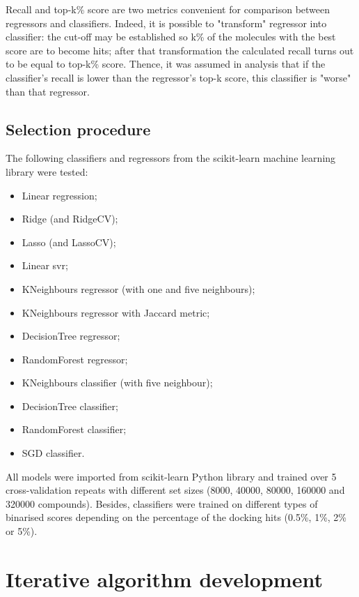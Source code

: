 Recall and top-k\% score are two metrics convenient for comparison between regressors and classifiers.
Indeed, it is possible to "transform" regressor into classifier: the cut-off may be established so k\% of the molecules with the best score are to become hits; after that transformation the calculated recall turns out to be equal to top-k\% score.
Thence, it was assumed in analysis that if the classifier's recall is lower than the regressor's top-k score, this classifier is "worse" than that regressor.\\

\subsection{Selection procedure}

The following classifiers and regressors from the scikit-learn machine learning library were tested:
\begin{itemize}
    \item Linear regression;
    \item Ridge (and RidgeCV);
    \item Lasso (and LassoCV);
    \item Linear \acrshort{svr};
    \item KNeighbours regressor (with one and five neighbours);
    \item KNeighbours regressor with Jaccard metric;
    \item DecisionTree regressor;
    \item RandomForest regressor;
    \item KNeighbours classifier (with five neighbour);
    \item DecisionTree classifier;
    \item RandomForest classifier;
    \item SGD classifier.
\end{itemize}

All models were imported from scikit-learn Python library and trained over 5 cross-validation repeats with different set sizes (8000, 40000, 80000, 160000 and 320000 compounds).
Besides, classifiers were trained on different types of binarised scores depending on the percentage of the docking hits (0.5\%, 1\%, 2\% or 5\%).


\section{Iterative algorithm development}

